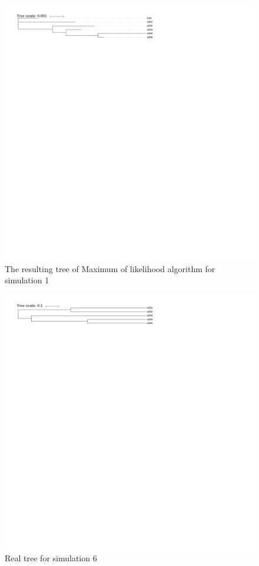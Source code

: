 \documentclass[]{article}
\theoremstyle{definition}
\begin{document}
\begin{figure}[H]
	\includegraphics*[width = \linewidth]{image/tree_1_MLGO.pdf}
	\caption{The resulting tree of Maximum of likelihood algorithm for simulation 1 }
\end{figure}

\begin{figure}[H]
	\includegraphics*[width = \linewidth]{image/tree_6_true.pdf}
	\caption{ Real tree for simulation 6 }
\end{figure}
\end{document}
